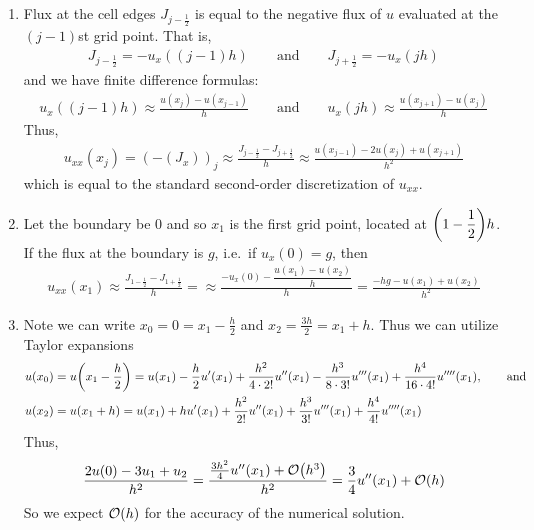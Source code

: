 \documentclass{article} %
\theoremstyle{plain}
\numberwithin{equation}{section} %
\numberwithin{figure}{section} %
\numberwithin{table}{section} %
\begin{document}
\begin{enumerate}[\ \ (a)]
    \item
        Flux at the cell edges $J_{j-\frac{1}{2}}$ is equal to the negative flux of $u$ evaluated at the $(j-1)$st grid point.  That is,
        \begin{align}
            J_{j-\frac{1}{2}} = -u_x((j-1)h) \qquad \text{and} \qquad J_{j+\frac{1}{2}} = -u_x(jh)
        \end{align}
        and we have finite difference formulas:
        \begin{align}
            u_x((j-1)h) \approx \frac{u(x_j) - u(x_{j-1})}{h} \qquad \text{and} \qquad u_x(jh) \approx \frac{u(x_{j+1}) - u(x_j)}{h}
        \end{align}
        Thus,
        \begin{align}
            u_{xx}(x_j) = (-(J_x))_j \approx \frac{J_{j-\frac{1}{2}} - J_{j+\frac{1}{2}}}{h} \approx \frac{u(x_{j-1}) - 2u(x_j) + u(x_{j+1})}{h^2}
        \end{align}
        which is equal to the standard second-order discretization of $u_{xx}$.
    \item
        Let the boundary be $0$ and so $x_1$ is the first grid point, located at $\qty(1 - \dfrac{1}{2})h$.  If the flux at the boundary is $g$, i.e.~if $u_x(0) = g$, then
        \begin{align}
            u_{xx}(x_1) \approx \frac{J_{1 - \frac{1}{2}} - J_{1 + \frac{1}{2}}}{h} = \approx \frac{-u_x(0) - \dfrac{u(x_1) - u(x_2)}{h}}{h} = \frac{-hg - u(x_1) + u(x_2)}{h^2}
        \end{align}
    \item
        Note we can write $x_0 = 0 = x_1 - \frac{h}{2}$ and $x_2 = \frac{3h}{2} = x_1 + h$.  Thus we can utilize Taylor expansions
        \begin{align}
            u(x_0) &= u\qty(x_1 - \frac{h}{2}) = u(x_1) - \frac{h}{2}u'(x_1) + \frac{h^2}{4\cdot2!}u''(x_1) - \frac{h^3}{8\cdot3!}u'''(x_1) + \frac{h^4}{16\cdot4!}u''''(x_1), \qquad \text{and} \\
            u(x_2) &= u\qty(x_1 + h) = u(x_1) + hu'(x_1) + \frac{h^2}{2!}u''(x_1) + \frac{h^3}{3!}u'''(x_1) + \frac{h^4}{4!}u''''(x_1)
        \end{align}
        Thus,
        \begin{align}
            \frac{2u(0) - 3u_1 + u_2}{h^2} = \frac{\frac{3h^2}{4}u''(x_1) + \order{h^3}}{h^2} = \frac{3}{4}u''(x_1) + \order{h}
        \end{align}
        So we expect $\order{h}$ for the accuracy of the numerical solution.
\end{enumerate}
\end{document}
